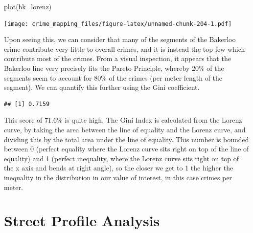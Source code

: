\documentclass[
  krantz2]{krantz}
\makeatletter
\newenvironment{Shaded}{\begin{snugshade}}{\end{snugshade}}
\newcommand{\AttributeTok}[1]{\textcolor[rgb]{0.61,0.61,0.61}{#1}}
\newcommand{\FunctionTok}[1]{\textcolor[rgb]{0,0,0}{#1}}
\newcommand{\NormalTok}[1]{#1}
\newcommand{\SpecialCharTok}[1]{\textcolor[rgb]{0,0,0}{#1}}
\newcommand{\StringTok}[1]{\textcolor[rgb]{0.5,0.5,0.5}{#1}}
\newenvironment{kframe}{%
\medskip{}
\setlength{\fboxsep}{.8em}
 \def\at@end@of@kframe{}%
 \ifinner\ifhmode%
  \def\at@end@of@kframe{\end{minipage}}%
  \begin{minipage}{\columnwidth}%
 \fi\fi%
 \def\FrameCommand##1{\hskip\@totalleftmargin \hskip-\fboxsep
 \colorbox{shadecolor}{##1}\hskip-\fboxsep
     \hskip-\linewidth \hskip-\@totalleftmargin \hskip\columnwidth}%
 \MakeFramed {\advance\hsize-\width
   \@totalleftmargin\z@ \linewidth\hsize
   \@setminipage}}%
 {\par\unskip\endMakeFramed%
 \at@end@of@kframe}
\renewenvironment{Shaded}{\begin{kframe}}{\end{kframe}}
\makeatother
\begin{document}
\begin{Shaded}
\begin{Highlighting}[]
\FunctionTok{plot}\NormalTok{(bk\_lorenz)}
\end{Highlighting}
\end{Shaded}

\texttt{[image: crime\_mapping\_files/figure-latex/unnamed-chunk-204-1.pdf]}

Upon seeing this, we can consider that many of the segments of the Bakerloo crime contribute very little to overall crimes, and it is instead the top few which contribute most of the crimes. From a visual inspection, it appears that the Bakerloo line very precisely fits the Pareto Principle, whereby 20\% of the segments seem to account for 80\% of the crimes (per meter length of the segment). We can quantify this further using the Gini coefficient.

\begin{Shaded}
\end{Shaded}

\begin{verbatim}
## [1] 0.7159
\end{verbatim}

This score of 71.6\% is quite high. The Gini Index is calculated from the Lorenz curve, by taking the area between the line of equality and the Lorenz curve, and dividing this by the total area under the line of equality. This number is bounded between 0 (perfect equality where the Lorenz curve sits right on top of the line of equality) and 1 (perfect inequality, where the Lorenz curve sits right on top of the x axis and bends at right angle), so the closer we get to 1 the higher the inequality in the distribution in our value of interest, in this case crimes per meter.

\hypertarget{street-profile-analysis}{%
\section{Street Profile Analysis}\label{street-profile-analysis}}
\end{document}
